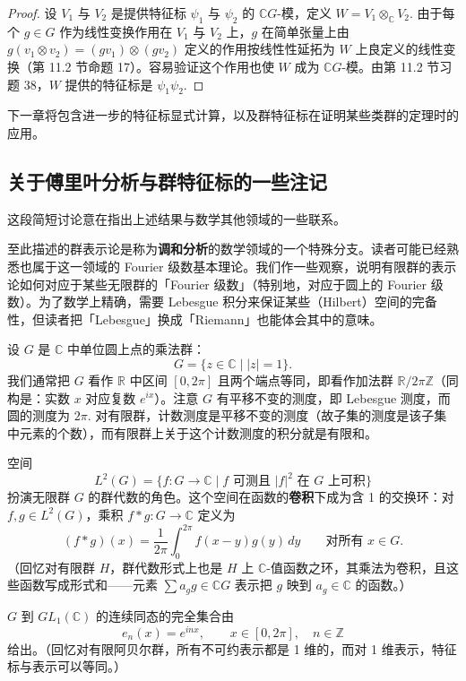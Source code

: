 \begin{proof}
设 \(V_1\) 与 \(V_2\) 是提供特征标 \(\psi_1\) 与 \(\psi_2\) 的 \(\mathbb{C}G\)-模，定义 \(W = V_1 \otimes_{\mathbb{C}}V_2\). 由于每个 \(g \in G\) 作为线性变换作用在 \(V_1\) 与 \(V_2\) 上，\(g\) 在简单张量上由 \(g(v_1 \otimes v_2) = (gv_1)\otimes(gv_2)\) 定义的作用按线性性延拓为 \(W\) 上良定义的线性变换（第 11.2 节命题 17）。容易验证这个作用也使 \(W\) 成为 \(\mathbb{C}G\)-模。由第 11.2 节习题 38，\(W\) 提供的特征标是 \(\psi_1\psi_2\).
\end{proof}

下一章将包含进一步的特征标显式计算，以及群特征标在证明某些类群的定理时的应用。

\subsection*{关于傅里叶分析与群特征标的一些注记}

这段简短讨论意在指出上述结果与数学其他领域的一些联系。

至此描述的群表示论是称为\textbf{调和分析}的数学领域的一个特殊分支。读者可能已经熟悉也属于这一领域的 Fourier 级数基本理论。我们作一些观察，说明有限群的表示论如何对应于某些无限群的「Fourier 级数」（特别地，对应于圆上的 Fourier 级数）。为了数学上精确，需要 Lebesgue 积分来保证某些（Hilbert）空间的完备性，但读者把「Lebesgue」换成「Riemann」也能体会其中的意味。

设 \(G\) 是 \(\mathbb{C}\) 中单位圆上点的乘法群：
\[
G = \{z \in \mathbb{C} \mid |z| = 1\}.
\]
我们通常把 \(G\) 看作 \(\mathbb{R}\) 中区间 \([0, 2\pi]\) 且两个端点等同，即看作加法群 \(\mathbb{R}/2\pi\mathbb{Z}\)（同构是：实数 \(x\) 对应复数 \(e^{ix}\)）。注意 \(G\) 有平移不变的测度，即 Lebesgue 测度，而圆的测度为 \(2\pi\). 对有限群，计数测度是平移不变的测度（故子集的测度是该子集中元素的个数），而有限群上关于这个计数测度的积分就是有限和。

空间
\[
L^2(G) = \{f : G \to \mathbb{C} \mid f \text{ 可测且 } |f|^2 \text{ 在 } G \text{ 上可积}\}
\]
扮演无限群 \(G\) 的群代数的角色。这个空间在函数的\textbf{卷积}下成为含 1 的交换环：对 \(f, g \in L^2(G)\)，乘积 \(f * g : G \to \mathbb{C}\) 定义为
\[
(f*g)(x) = \frac{1}{2\pi}\int_0^{2\pi}f(x-y)g(y)\,dy \qquad \text{对所有 } x \in G.
\]
（回忆对有限群 \(H\)，群代数形式上也是 \(H\) 上 \(\mathbb{C}\)-值函数之环，其乘法为卷积，且这些函数写成形式和——元素 \(\sum a_gg \in \mathbb{C}G\) 表示把 \(g\) 映到 \(a_g \in \mathbb{C}\) 的函数。）

\(G\) 到 \(GL_1(\mathbb{C})\) 的连续同态的完全集合由
\[
e_n(x) = e^{inx}, \qquad x \in [0, 2\pi],\quad n \in \mathbb{Z}
\]
给出。（回忆对有限阿贝尔群，所有不可约表示都是 1 维的，而对 1 维表示，特征标与表示可以等同。）


